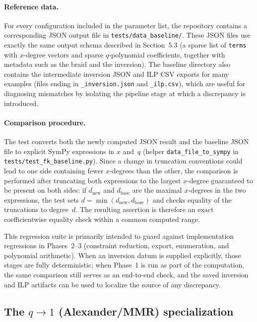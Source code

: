 \documentclass[twocolumn]{article}
\begin{document}
\paragraph{Reference data.}
For every configuration included in the parameter list, the repository contains
a corresponding JSON output file in \texttt{tests/data\_baseline/}.
These JSON files use exactly the same output schema described in
Section~5.3 (a sparse list of \texttt{terms} with $x$-degree vectors and sparse
$q$-polynomial coefficients, together with metadata such as the braid and the
inversion).
The baseline directory also contains the intermediate inversion JSON and ILP CSV
exports for many examples (files ending in \texttt{\_inversion.json} and
\texttt{\_ilp.csv}), which are useful for diagnosing mismatches by isolating the
pipeline stage at which a discrepancy is introduced.

\paragraph{Comparison procedure.}
The test converts both the newly computed JSON result and the baseline JSON file
to explicit SymPy expressions in $x$ and~$q$ (helper \texttt{data\_file\_to\_sympy}
in \texttt{tests/test\_fk\_baseline.py}).
Since a change in truncation conventions could lead to one side containing fewer
$x$-degrees than the other, the comparison is performed after truncating both
expressions to the largest $x$-degree guaranteed to be present on both sides:
if $d_{\mathrm{new}}$ and $d_{\mathrm{base}}$ are the maximal $x$-degrees in the
two expressions, the test sets $d=\min(d_{\mathrm{new}},d_{\mathrm{base}})$ and
checks equality of the truncations to degree~$d$.
The resulting assertion is therefore an exact coefficientwise equality check
within a common computed range.

This regression suite is primarily intended to guard against implementation
regressions in Phases~2--3 (constraint reduction, export, enumeration, and
polynomial arithmetic).  When an inversion datum is supplied explicitly, those
stages are fully deterministic; when Phase~1 is run as part of the computation,
the same comparison still serves as an end-to-end check, and the saved inversion
and ILP artifacts can be used to localize the source of any discrepancy.

\subsection{The $q\to 1$ (Alexander/MMR) specialization}
\end{document}
